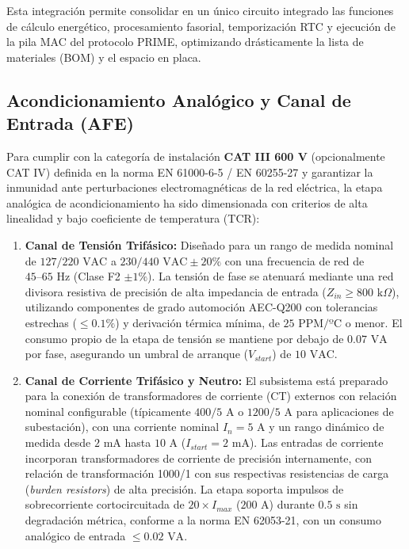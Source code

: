 Esta integración permite consolidar en un único circuito integrado las funciones de cálculo energético, procesamiento fasorial, temporización RTC y ejecución de la pila MAC del protocolo PRIME, optimizando drásticamente la lista de materiales (BOM) y el espacio en placa.

\subsection{Acondicionamiento Analógico y Canal de Entrada (AFE)}
\label{subsec:acondicionamiento_analogo}

Para cumplir con la categoría de instalación \textbf{CAT III 600 V} (opcionalmente CAT IV) definida en la norma EN 61000-6-5 / EN 60255-27 y garantizar la inmunidad ante perturbaciones electromagnéticas de la red eléctrica, la etapa analógica de acondicionamiento ha sido dimensionada con criterios de alta linealidad y bajo coeficiente de temperatura (TCR):

\begin{enumerate}
    \item \textbf{Canal de Tensión Trifásico:} Diseñado para un rango de medida nominal de $127/220\text{ VAC}$ a $230/440\text{ VAC} \pm 20\%$ con una frecuencia de red de $45\text{--}65\text{ Hz}$ (Clase F2 $\pm 1\%$). La tensión de fase se atenuará mediante una red divisora resistiva de precisión de alta impedancia de entrada ($Z_{in} \ge 800\text{ k}\Omega$), utilizando componentes de grado automoción AEC-Q200 con tolerancias estrechas ($\le 0.1\%$) y derivación térmica mínima, de $25 \text{ PPM/ºC}$ o menor. El consumo propio de la etapa de tensión se mantiene por debajo de $0.07\text{ VA}$ por fase, asegurando un umbral de arranque ($V_{start}$) de $10\text{ VAC}$.
    
    \item \textbf{Canal de Corriente Trifásico y Neutro:} El subsistema está preparado para la conexión de transformadores de corriente (CT) externos con relación nominal configurable (típicamente $400/5\text{ A}$ o $1200/5\text{ A}$ para aplicaciones de subestación), con una corriente nominal $I_n = 5\text{ A}$ y un rango dinámico de medida desde $2\text{ mA}$ hasta $10\text{ A}$ ($I_{start} = 2\text{ mA}$). Las entradas de corriente incorporan transformadores de corriente de precisión internamente, con relación de transformación 1000/1 con sus respectivas resistencias de carga (\textit{burden resistors}) de alta precisión. La etapa soporta impulsos de sobrecorriente cortocircuitada de $20 \times I_{max}$ ($200\text{ A}$) durante $0.5\text{ s}$ sin degradación métrica, conforme a la norma EN 62053-21, con un consumo analógico de entrada $\le 0.02\text{ VA}$.
\end{enumerate}

